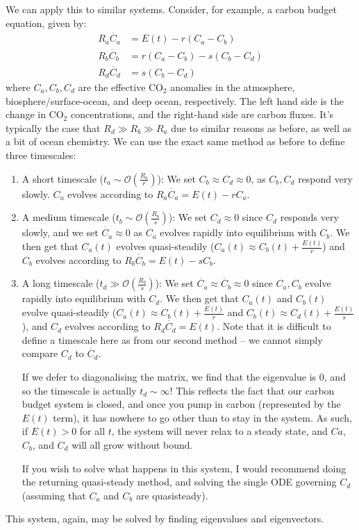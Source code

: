 We can apply this to similar systems. Consider, for example, a carbon budget equation, given by:
\begin{align}
    R_a \dot{C_a} &= E(t)-r (C_a-C_b) \\ 
    R_b \dot{C_b} &= r (C_a-C_b) - s (C_b-C_d)\\
    R_d \dot{C_d} &=  s (C_b-C_d)
\end{align}
where $C_a,C_b,C_d$ are the effective CO$_2$ anomalies in the atmosphere, biosphere/surface-ocean, and deep ocean, respectively. The left hand side is the change in CO$_2$ concentrations, and the right-hand side are carbon fluxes. It's typically the case that $R_d\gg R_b\gg R_a$ due to similar reasons as before, as well as a bit of ocean chemistry. We can use the exact same method as before to define three timescales:
\begin{enumerate}
    \item A short timescale ($t_a\sim\mathcal{O}\left(\frac{R_a}{r}\right)$):  We set $C_b\approx C_d\approx 0$, as $C_b,C_d$ respond very slowly. $C_a$ evolves according to $R_a \dot{C_a} = E(t)-r C_a$.
    \item A medium timescale ($t_b\sim\mathcal{O}\left(\frac{R_b}{s}\right)$): We set $C_d \approx 0$ since $C_d$ responds very slowly, and we set $\dot{C_a} \approx 0$ as $C_a$ evolves rapidly into equilibrium with $C_b$. We then get that $C_a(t)$ evolves quasi-steadily ($C_a(t)\approx C_b(t)+\frac{E(t)}{r}$) and $C_b$ evolves according to $R_b \dot{C_b}=E(t)-sC_b$.
    \item A long timescale ($t_d\gg\mathcal{O}\left(\frac{R_b}{s}\right)$): We set $\dot{C_a}\approx \dot{C_b} \approx 0$ since $C_a,C_b$ evolve rapidly into equilibrium with $C_d$. We then get that $C_a(t)$ and $C_b(t)$ evolve quasi-steadily ($C_a(t)\approx C_b(t)+\frac{E(t)}{r}$ and $C_b(t)\approx C_d(t) +\frac{E(t)}{s}$), and $C_d$ evolves according to $R_d \dot{C_d}=E(t)$. Note that it is difficult to define a timescale here as from our second method – we cannot simply compare $C_d$ to $\dot{C_d}$. 
    
    If we defer to diagonalising the matrix, we find that the eigenvalue is $0$, and so the timescale is actually $t_d\sim\infty$! This reflects the fact that our carbon budget system is closed, and once you pump in carbon (represented by the $E(t)$ term), it has nowhere to go other than to stay in the system. As such, if $E(t)>0$ for all $t$, the system will never relax to a steady state, and $Ca$, $C_b$, and $C_d$ will all grow without bound.

    If you wish to solve what happens in this system, I would recommend doing the returning quasi-steady method, and solving the single ODE governing $C_d$ (assuming that $C_a$ and $C_b$ are quasisteady). 
\end{enumerate}
This system, again, may be solved by finding eigenvalues and eigenvectors. 

